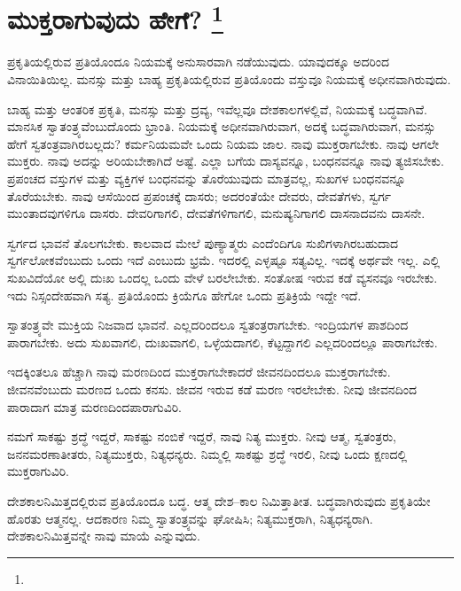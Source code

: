 
\chapter[ಮುಕ್ತರಾಗುವುದು ಹೇಗೆ? ]{ಮುಕ್ತರಾಗುವುದು ಹೇಗೆ? \protect\footnote{}}

ಪ್ರಕೃತಿಯಲ್ಲಿರುವ ಪ್ರತಿಯೊಂದೂ ನಿಯಮಕ್ಕೆ ಅನುಸಾರವಾಗಿ ನಡೆಯುವುದು. ಯಾವುದಕ್ಕೂ ಅದರಿಂದ ವಿನಾಯಿತಿಯಿಲ್ಲ. ಮನಸ್ಸು ಮತ್ತು ಬಾಹ್ಯ ಪ್ರಕೃತಿಯಲ್ಲಿರುವ ಪ್ರತಿಯೊಂದು ವಸ್ತುವೂ ನಿಯಮಕ್ಕೆ ಅಧೀನವಾಗಿರುವುದು.

ಬಾಹ್ಯ ಮತ್ತು ಆಂತರಿಕ ಪ್ರಕೃತಿ, ಮನಸ್ಸು ಮತ್ತು ದ್ರವ್ಯ, ಇವೆಲ್ಲವೂ ದೇಶ\break ಕಾಲಗಳಲ್ಲಿವೆ, ನಿಯಮಕ್ಕೆ ಬದ್ಧವಾಗಿವೆ. ಮಾನಸಿಕ ಸ್ವಾತಂತ್ರ್ಯವೆಂಬುದೊಂದು ಭ್ರಾಂತಿ. ನಿಯಮಕ್ಕೆ ಅಧೀನವಾಗಿರುವಾಗ, ಅದಕ್ಕೆ ಬದ್ಧವಾಗಿರುವಾಗ, ಮನಸ್ಸು ಹೇಗೆ ಸ್ವತಂತ್ರವಾಗಿರಬಲ್ಲದು? ಕರ್ಮನಿಯಮವೇ ಒಂದು ನಿಯಮ ಜಾಲ. ನಾವು ಮುಕ್ತರಾಗಬೇಕು. ನಾವು ಆಗಲೇ ಮುಕ್ತರು. ನಾವು ಅದನ್ನು ಅರಿಯಬೇಕಾಗಿದೆ ಅಷ್ಟೆ. ಎಲ್ಲಾ ಬಗೆಯ ದಾಸ್ಯವನ್ನೂ, ಬಂಧನವನ್ನೂ ನಾವು ತ್ಯಜಿಸಬೇಕು. ಪ್ರಪಂಚದ ವಸ್ತುಗಳ ಮತ್ತು ವ್ಯಕ್ತಿಗಳ ಬಂಧನವನ್ನು ತೊರೆಯುವುದು ಮಾತ್ರವಲ್ಲ, ಸುಖಗಳ ಬಂಧನವನ್ನೂ ತೊರೆಯಬೇಕು. ನಾವು ಆಸೆಯಿಂದ ಪ್ರಪಂಚಕ್ಕೆ ದಾಸರು; ಅದರಂತೆಯೇ ದೇವರು, ದೇವತೆಗಳು, ಸ್ವರ್ಗ ಮುಂತಾದವುಗಳಿಗೂ ದಾಸರು. ದೇವರಿಗಾಗಲಿ, ದೇವತೆಗಳಿಗಾಗಲಿ, ಮನುಷ್ಯನಿಗಾಗಲಿ ದಾಸನಾದವನು ದಾಸನೇ.

\vskip 0.1cm

ಸ್ವರ್ಗದ ಭಾವನೆ ತೊಲಗಬೇಕು. ಕಾಲವಾದ ಮೇಲೆ ಪುಣ್ಯಾತ್ಮರು ಎಂದೆಂದಿಗೂ ಸುಖಿಗಳಾಗಿರಬಹುದಾದ ಸ್ವರ್ಗಲೋಕವೆಂಬುದು ಒಂದು ಇದೆ ಎಂಬುದು ಭ್ರಮೆ. ಇದರಲ್ಲಿ ಎಳ್ಳಷ್ಟೂ ಸತ್ಯವಿಲ್ಲ. ಇದಕ್ಕೆ ಅರ್ಥವೇ ಇಲ್ಲ. ಎಲ್ಲಿ ಸುಖವಿದೆಯೋ ಅಲ್ಲಿ ದುಃಖ ಒಂದಲ್ಲ ಒಂದು ವೇಳೆ ಬರಲೇಬೇಕು. ಸಂತೋಷ ಇರುವ ಕಡೆ ವ್ಯಸನವೂ ಇರಬೇಕು. ಇದು ನಿಸ್ಸಂದೇಹವಾಗಿ ಸತ್ಯ. ಪ್ರತಿಯೊಂದು ಕ್ರಿಯೆಗೂ ಹೇಗೋ ಒಂದು ಪ್ರತಿಕ್ರಿಯೆ ಇದ್ದೇ ಇದೆ.

\vskip 0.1cm

ಸ್ವಾತಂತ್ರ್ಯವೇ ಮುಕ್ತಿಯ ನಿಜವಾದ ಭಾವನೆ. ಎಲ್ಲದರಿಂದಲೂ ಸ್ವತಂತ್ರರಾಗಬೇಕು. ಇಂದ್ರಿಯಗಳ ಪಾಶದಿಂದ ಪಾರಾಗಬೇಕು. ಅದು ಸುಖವಾಗಲಿ, ದುಃಖವಾಗಲಿ, ಒಳ್ಳೆಯದಾಗಲಿ, ಕೆಟ್ಟದ್ದಾಗಲಿ ಎಲ್ಲದರಿಂದಲ್ಲೂ ಪಾರಾಗಬೇಕು.

\vskip 0.1cm

ಇದಕ್ಕಿಂತಲೂ ಹೆಚ್ಚಾಗಿ ನಾವು ಮರಣದಿಂದ ಮುಕ್ತರಾಗಬೇಕಾದರೆ ಜೀವನದಿಂದಲೂ ಮುಕ್ತರಾಗಬೇಕು. ಜೀವನವೆಂಬುದು ಮರಣದ ಒಂದು ಕನಸು. ಜೀವನ ಇರುವ ಕಡೆ ಮರಣ ಇರಲೇಬೇಕು. ನೀವು ಜೀವನದಿಂದ ಪಾರಾದಾಗ ಮಾತ್ರ ಮರಣದಿಂದ\break ಪಾರಾಗುವಿರಿ.

\vskip 0.1cm

ನಮಗೆ ಸಾಕಷ್ಟು ಶ್ರದ್ಧೆ ಇದ್ದರೆ, ಸಾಕಷ್ಟು ನಂಬಿಕೆ ಇದ್ದರೆ, ನಾವು ನಿತ್ಯ ಮುಕ್ತರು. ನೀವು ಆತ್ಮ, ಸ್ವತಂತ್ರರು, ಜನನಮರಣಾತೀತರು, ನಿತ್ಯಮುಕ್ತರು, ನಿತ್ಯಧನ್ಯರು. ನಿಮ್ಮಲ್ಲಿ ಸಾಕಷ್ಟು ಶ್ರದ್ಧೆ ಇರಲಿ, ನೀವು ಒಂದು ಕ್ಷಣದಲ್ಲಿ ಮುಕ್ತರಾಗುವಿರಿ.

\vskip 0.1cm

ದೇಶಕಾಲನಿಮಿತ್ತದಲ್ಲಿರುವ ಪ್ರತಿಯೊಂದೂ ಬದ್ಧ. ಆತ್ಮ ದೇಶ–ಕಾಲ ನಿಮಿತ್ತಾತೀತ. ಬದ್ಧವಾಗಿರುವುದು ಪ್ರಕೃತಿಯೇ ಹೊರತು ಆತ್ಮನಲ್ಲ. ಆದಕಾರಣ ನಿಮ್ಮ ಸ್ವಾತಂತ್ರ್ಯವನ್ನು ಘೋಷಿಸಿ; ನಿತ್ಯಮುಕ್ತರಾಗಿ, ನಿತ್ಯಧನ್ಯರಾಗಿ. ದೇಶಕಾಲನಿಮಿತ್ತವನ್ನೇ ನಾವು ಮಾಯೆ ಎನ್ನುವುದು.

